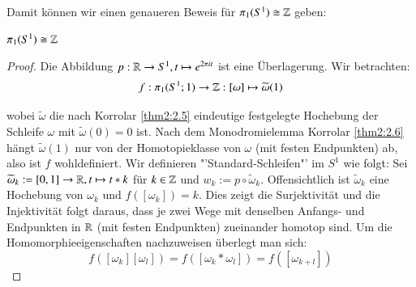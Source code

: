 \documentclass[a4paper,10pt]{scrartcl}
\newcommand{\homo}{\cong}
\begin{document}
Damit können wir einen genaueren Beweis für $\pi_1(S^1)\homo \Z$ geben:
\begin{st}
 $\pi_1(S^1)\homo \Z$
\end{st}
\begin{proof}
 Die Abbildung $p:\mathbb{R}\to S^1, t\mapsto e^{2\pi i t}$ ist eine Überlagerung. Wir betrachten:
\[
 f:\pi_1(S^1; 1)\to \mathbb{Z}: [\omega] \mapsto \widetilde \omega (1)
\]
\begin{figure}[H]
\centering
 \fixme[fig74]
\caption{}
\end{figure}
wobei $\tilde \omega$ die nach Korrolar \ref{thm2:2.5} eindeutige festgelegte Hochebung der Schleife $\omega$ mit $\tilde \omega(0)=0$ ist. Nach dem Monodromielemma Korrolar \ref{thm2:2.6} hängt $\tilde \omega(1)$ nur von der Homotopieklasse von $\omega$ (mit festen Endpunkten) ab, also ist $f$ wohldefiniert.
Wir definieren "'Standard-Schleifen"' im $S^1$ wie folgt: Sei $\widetilde \omega_k:= [0,1] \to \mathbb{R}, t \mapsto t * k$ für $k \in \mathbb{Z}$ und $w_k:=p\circ \tilde \omega_k$. Offensichtlich ist $\tilde \omega_k$ eine Hochebung von $\omega_k$ und $f([\omega_k])=k$. Dies zeigt die Surjektivität und die Injektivität folgt daraus, dass je zwei Wege mit denselben Anfangs- und Endpunkten in $\mathbb{R}$ (mit festen Endpunkten) zueinander homotop sind. Um die Homomorphieeigenschaften nachzuweisen überlegt man sich:
\[
 f([\omega_k][\omega_l])=f([\omega_k * \omega_l])=f([\omega_{k+l}])
\]
\end{proof}
\end{document}
